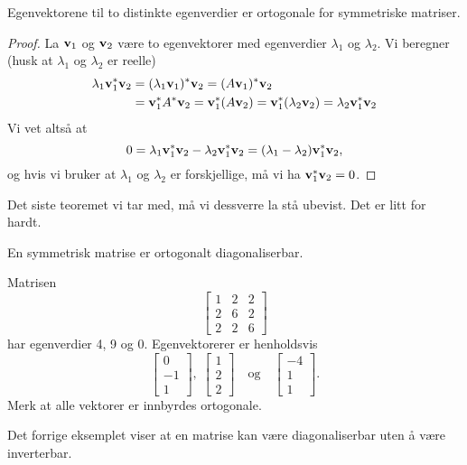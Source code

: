 \begin{thm}
Egenvektorene til to distinkte egenverdier er ortogonale for symmetriske matriser.
\end{thm}

\begin{proof}
La $\mathbf{v}_1$ og $\mathbf{v}_2$ være to egenvektorer med egenverdier $\lambda_1$ og $\lambda_2$. 
Vi beregner (husk at $\lambda_1$ og $\lambda_2$ er reelle)
\begin{align*}
\lambda_1 \mathbf{v}_1^*\mathbf{v}_2&=(\lambda_1 \mathbf{v}_1)^*\mathbf{v}_2=(A \mathbf{v}_1)^*\mathbf{v}_2\\&= \mathbf{v}_1^*A^*\mathbf{v}_2=\mathbf{v}_1^*(A\mathbf{v}_2)=\mathbf{v}_1^*(\lambda_2\mathbf{v}_2)=\lambda_2 \mathbf{v}_1^*\mathbf{v}_2
\end{align*}
Vi vet altså at
\[
0= \lambda_1 \mathbf{v}_1^*\mathbf{v}_2-\lambda_2 \mathbf{v}_1^*\mathbf{v}_2=(\lambda_1-\lambda_2) \mathbf{v}_1^*\mathbf{v}_2,
\]
og hvis vi bruker at $\lambda_1$ og $\lambda_2$ er forskjellige, må vi ha $\mathbf{v}_1^*\mathbf{v}_2=0$.
\end{proof}

\noindent Det siste teoremet vi tar med, må vi dessverre la stå ubevist. Det er litt for hardt.
\begin{thm}
En  symmetrisk matrise er ortogonalt diagonaliserbar.
\end{thm}

\begin{ex}
Matrisen 
\[
\begin{bmatrix}
1 & 2 & 2\\  2 &6 & 2 \\ 2 & 2 & 6
\end{bmatrix}
\]
har egenverdier 4, 9 og 0. Egenvektorerer er henholdsvis
\[
\begin{bmatrix}
0 \\ -1 \\ 1
\end{bmatrix},
\;
\begin{bmatrix}
1 \\ 2 \\ 2
\end{bmatrix}
\quad \text{og} \quad
\begin{bmatrix}
-4 \\ 1 \\ 1
\end{bmatrix}.
\]
Merk at alle vektorer er innbyrdes ortogonale.
\end{ex}

\begin{merkx}
Det forrige eksemplet viser at en matrise kan være diagonaliserbar uten å være inverterbar.
\end{merkx}







\kapittelslutt
